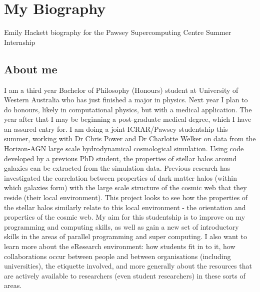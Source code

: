 \section{My Biography}
Emily Hackett biography for the Pawsey Supercomputing Centre Summer Internship
\subsection{About me}
I am a third year Bachelor of Philosophy (Honours) student at University of Western Australia who has just finished a major in physics. Next year I plan to do honours, likely in computational physics, but with a medical application. The year after that I may be beginning a post-graduate medical degree, which I have an assured entry for. 
I am doing a joint ICRAR/Pawsey studentship this summer, working with Dr Chris Power and Dr Charlotte Welker on data from the Horizon-AGN large scale hydrodynamical cosmological simulation. Using code developed by a previous PhD student, the properties of stellar halos around galaxies can be extracted from the simulation data. Previous research has investigated the correlation between properties of dark matter halos (within which galaxies form) with the large scale structure of the cosmic web that they reside (their local environment). This project looks to see how the properties of the stellar halos similarly relate to this local environment - the orientation and properties of the cosmic web.
My aim for this studentship is to improve on my programming and computing skills, as well as gain a new set of introductory skills in the areas of parallel programming and super computing. I also want to learn more about the eResearch environment: how students fit in to it, how collaborations occur between people and between organisations (including universities), the etiquette involved, and more generally about the resources that are actively available to researchers (even student researchers) in these sorts of areas.

